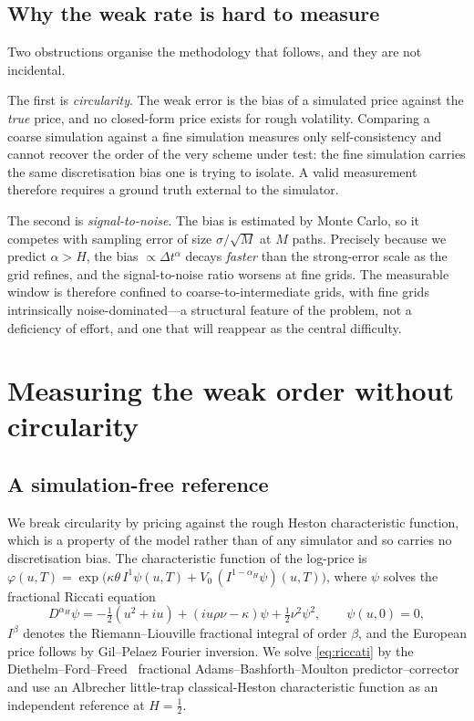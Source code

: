 \documentclass{ws-ijtaf}
\begin{document}
\subsection{Why the weak rate is hard to measure}

Two obstructions organise the methodology that follows, and they are not incidental.

The first is \emph{circularity}. The weak error is the bias of a simulated price against
the \emph{true} price, and no closed-form price exists for rough volatility. Comparing a
coarse simulation against a fine simulation measures only self-consistency and cannot
recover the order of the very scheme under test: the fine simulation carries the same
discretisation bias one is trying to isolate. A valid measurement therefore requires a
ground truth external to the simulator.

The second is \emph{signal-to-noise}. The bias is estimated by Monte Carlo, so it
competes with sampling error of size $\sigma/\sqrt{M}$ at $M$ paths. Precisely because
we predict $\alpha>H$, the bias $\propto \Delta t^{\alpha}$ decays \emph{faster} than the
strong-error scale as the grid refines, and the signal-to-noise ratio worsens at fine
grids. The measurable window is therefore confined to coarse-to-intermediate grids,
with fine grids intrinsically noise-dominated---a structural feature of the problem, not
a deficiency of effort, and one that will reappear as the central difficulty.

\section{Measuring the weak order without circularity}\label{sec:method}

\subsection{A simulation-free reference}

We break circularity by pricing against the rough Heston characteristic function, which
is a property of the model rather than of any simulator and so carries no discretisation
bias. The characteristic function of the log-price is
$\varphi(u,T)=\exp\big(\kappa\theta\,I^1\psi(u,T) + V_0\,(I^{1-\alpha_{\!H}}\psi)(u,T)\big)$,
where $\psi$ solves the fractional Riccati equation
\begin{equation}
D^{\alpha_{\!H}}\psi
 = -\tfrac12(u^2+iu) + (iu\rho\nu - \kappa)\psi + \tfrac12\nu^2\psi^2,
\qquad \psi(u,0)=0, \label{eq:riccati}
\end{equation}
$I^{\beta}$ denotes the Riemann--Liouville fractional integral of order $\beta$, and the
European price follows by Gil--Pelaez Fourier inversion. We solve \eqref{eq:riccati}
by the Diethelm--Ford--Freed~\citeyearpar{dff2002} fractional Adams--Bashforth--Moulton predictor--corrector
and use an Albrecher little-trap classical-Heston characteristic function as an
independent reference at $H=\tfrac12$.
\end{document}
